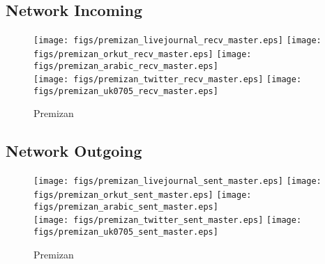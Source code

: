 \documentclass{article}
\newcommand{\bline}[1][1]{\vspace{#1\baselineskip}}
\begin{document}
\pagebreak
\subsection{Network Incoming}
\begin{figure}[!h]
  \bline[1]
  \centering
  \texttt{[image: figs/premizan\_livejournal\_recv\_master.eps]}\hspace{1em}%
  \texttt{[image: figs/premizan\_orkut\_recv\_master.eps]}\hspace{1em}%
  \texttt{[image: figs/premizan\_arabic\_recv\_master.eps]}\\
  \texttt{[image: figs/premizan\_twitter\_recv\_master.eps]}\hspace{1em}%
  \texttt{[image: figs/premizan\_uk0705\_recv\_master.eps]}
  \caption{Premizan}
\end{figure}

\pagebreak
\subsection{Network Outgoing}
\begin{figure}[!h]
  \bline[1]
  \centering
  \texttt{[image: figs/premizan\_livejournal\_sent\_master.eps]}\hspace{1em}%
  \texttt{[image: figs/premizan\_orkut\_sent\_master.eps]}\hspace{1em}%
  \texttt{[image: figs/premizan\_arabic\_sent\_master.eps]}\\
  \texttt{[image: figs/premizan\_twitter\_sent\_master.eps]}\hspace{1em}%
  \texttt{[image: figs/premizan\_uk0705\_sent\_master.eps]}
  \caption{Premizan}
\end{figure}
\end{document}
